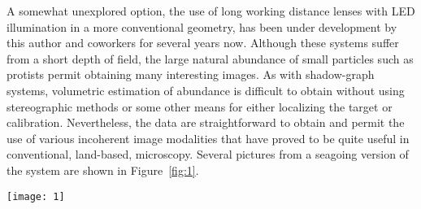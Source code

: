 \documentclass[twocolumn]{article}
\begin{document}
A somewhat unexplored option, the use of long working distance lenses with LED illumination in a more conventional geometry, has been under development by this author and coworkers for several years now. Although these systems suffer from a short depth of field, the large natural abundance of small particles such as protists permit obtaining many interesting images. As with shadow-graph systems, volumetric estimation of abundance is difficult to obtain without using stereographic methods or some other means for either localizing the target or calibration. Nevertheless, the data are straightforward to obtain and permit the use of various incoherent image modalities that have proved to be quite useful in conventional, land-based, microscopy. Several pictures from a seagoing version of the system are shown in Figure~\ref{fig:1}.
\begin{figure*}[htbp]
\centering
\texttt{[image: 1]}
\caption{Several images of phytoplankton collected at sea with an underwater microscope system.(a)Helical spiral of Eucampia cells, a diatom.(b)Linear
chain of the diatom type Chaetoceros}
\label{fig:1}
\end{figure*}


\end{document}
